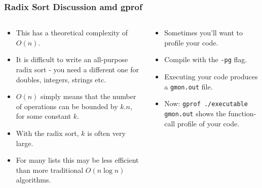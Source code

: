 \begin{frame}[fragile]
\frametitle{Radix Sort Discussion amd gprof}

\begin{columns}[T]

\begin{column}{0.45\textwidth}
\begin{itemize}[<+->]
\item This has a theoretical complexity of $O(n)$.
\item It is difficult to write an all-purpose radix sort - you need a different one for doubles, integers, strings etc.
\item $O(n)$ simply means that the number of operations can be bounded by $k.n$, for some constant $k$.
\item With the radix sort, $k$ is often very large.
\item For many lists this may be less efficient than more traditional $O(n \log n)$ algorithms.
\end{itemize}
\end{column}

\begin{column}{0.45\textwidth}
\begin{itemize}[<+->]
\item Sometimes you'll want to profile your code.
\item Compile with the \verb^-pg^ flag.
\item Executing your code produces a \verb^gmon.out^ file.
\item Now: \verb^gprof ./executable gmon.out^ shows the function-call profile of your code.
\end{itemize}
\end{column}

\end{columns}
\end{frame}


